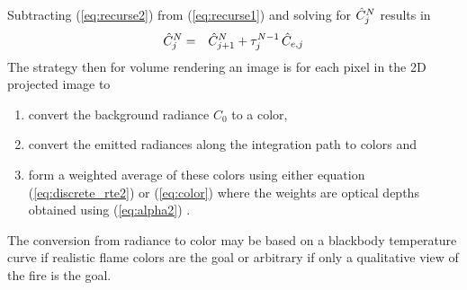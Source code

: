 Subtracting (\ref{eq:recurse2}) from (\ref{eq:recurse1}) and solving
for $\hat{C}_{j}^N$ results in
\begin{eqnarray}
\label{eq:color}
\hat{C}_{j}^N&=&\hat{C}_{j+1}^N+\tau_{j}^{N-1}\,\hat{C}_{e,j}
\end{eqnarray}
The strategy then for volume rendering an image is for each pixel
in the 2D projected image to
\begin{enumerate}
\item convert the background radiance $C_0$ to a color,

\item convert the emitted radiances along the integration path to
colors and

\item form a weighted average of these colors using either
equation (\ref{eq:discrete_rte2}) or (\ref{eq:color}) where the
weights are optical depths obtained using (\ref{eq:alpha2}) .

\end{enumerate}
The conversion from radiance to color may be based on a blackbody
temperature curve if realistic flame colors are the goal or
arbitrary if only a qualitative view of the fire is the goal.
